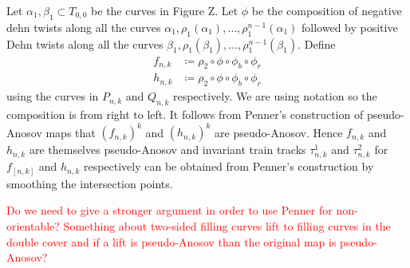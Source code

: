 Let $\alpha_1,\beta_1 \subset T_{0,0}$ be the curves in Figure Z. Let $\phi$ be the composition of negative dehn twists along all the curves $\alpha_1, \rho_1(\alpha_1), \dots, \rho_1^{n-1}(\alpha_1)$ followed by positive Dehn twists along all the curves $\beta_1,\rho_1(\beta_1),\dots,\rho_1^{n-1}(\beta_1)$. Define 
\begin{align*}
    f_{n,k} &\coloneqq \rho_2 \circ \phi \circ \phi_b \circ \phi_r \\
    h_{n,k} & \coloneqq \rho_2 \circ \phi \circ \phi_b \circ \phi_r
\end{align*}
using the curves in $P_{n,k}$ and $Q_{n,k}$ respectively. We are using notation so the composition is from right to left. It follows from Penner's construction of pseudo-Anosov maps that $(f_{n,k})^k$ and $(h_{n,k})^k$ are pseudo-Anosov. Hence $f_{n,k}$ and $h_{n,k}$ are themselves pseudo-Anosov and invariant train tracks $\tau^1_{n,k}$ and $\tau^2_{n,k}$ for $f_[n,k]$ and $h_{n,k}$ respectively can be obtained from Penner's construction by smoothing the intersection points.

\textcolor{red}{Do we need to give a stronger argument in order to use Penner for non-orientable? Something about two-sided filling curves lift to filling curves in the double cover and if a lift is pseudo-Anosov than the original map is pseudo-Anosov?}
